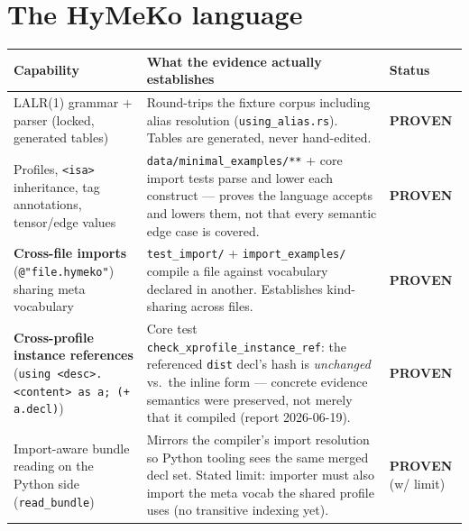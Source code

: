 \documentclass[11pt]{article}
\makeatletter
\newcommand{\sProven}{\textcolor{green!55!black}{\textbf{PROVEN}}}
\newcommand{\qual}[1]{{\footnotesize #1}}
\newcommand{\code}[1]{\texttt{\small #1}}
\newenvironment{captable}{%
  \begin{longtable}{@{}p{4.9cm}p{8.1cm}>{\raggedright\arraybackslash}p{2.5cm}@{}}
  \toprule
  \textbf{Capability} & \textbf{What the evidence actually establishes} & \textbf{Status}\\
  \midrule\endhead}{%
  \bottomrule\end{longtable}}
\makeatother
\begin{document}
\section{The HyMeKo language}
\begin{captable}
LALR(1) grammar + parser (locked, generated tables)
  & Round-trips the fixture corpus including alias resolution (\code{using\_alias.rs}).
    Tables are generated, never hand-edited.
  & \sProven\\
\addlinespace
Profiles, \code{<isa>} inheritance, tag annotations, tensor/edge values
  & \code{data/minimal\_examples/**} + core import tests parse and lower each construct ---
    proves the language accepts and lowers them, not that every semantic edge case is covered.
  & \sProven\\
\addlinespace
\textbf{Cross-file imports} (\code{@"file.hymeko"}) sharing meta vocabulary
  & \code{test\_import/} + \code{import\_examples/} compile a file against vocabulary declared
    in another. Establishes kind-sharing across files.
  & \sProven\\
\addlinespace
\textbf{Cross-profile instance references} (\code{using <desc>.<content> as a; (+ a.decl)})
  & Core test \code{check\_xprofile\_instance\_ref}: the referenced \code{dist} decl's hash is
    \emph{unchanged} vs.\ the inline form --- concrete evidence semantics were preserved, not
    merely that it compiled (report 2026-06-19).
  & \sProven\\
\addlinespace
Import-aware bundle reading on the Python side (\code{read\_bundle})
  & Mirrors the compiler's import resolution so Python tooling sees the same merged decl set.
    Stated limit: importer must also import the meta vocab the shared profile uses (no
    transitive indexing yet).
  & \sProven{} \qual{(w/ limit)}\\
\end{captable}
\end{document}
